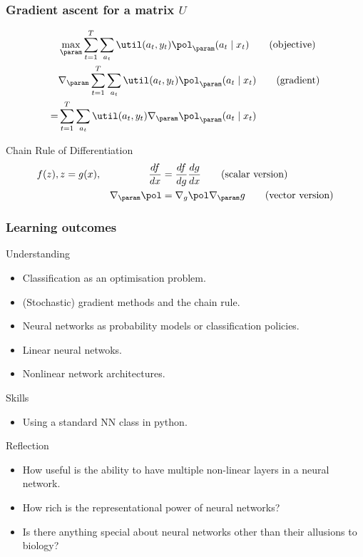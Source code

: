 \begin{frame}
\frametitle{Gradient ascent for a matrix $U$}
\begin{align}
  &\max_\param \sum_{t=1}^T \sum_{a_t} \util(a_t, y_t) \pol_\param(a_t \mid x_t ) \tag{objective}\\
  &\nabla_\param \sum_{t=1}^T \sum_{a_t} \util(a_t, y_t) \pol_\param(a_t \mid x_t ) \tag{gradient}\\
  =& \sum_{t=1}^T \sum_{a_t} \util(a_t, y_t) \nabla_\param \pol_\param(a_t \mid x_t )
\end{align}
\begin{block}{Chain Rule of Differentiation}
  \begin{align*}
    f(z), z = g(x), && \frac{df}{dx} &= \frac{df}{dg} \frac{dg}{dx} \tag{scalar version}\\
    && \nabla_\param \pol &= \nabla_g \pol \nabla_\param g \tag{vector version}
  \end{align*}
\end{block}
\end{frame}


\begin{frame}
  \frametitle{Learning outcomes}
  \begin{block}{Understanding}
    \begin{itemize}
    \item Classification as an optimisation problem.
    \item (Stochastic) gradient methods and the chain rule.
    \item Neural networks as probability models or classification policies.
    \item Linear neural netwoks.
    \item Nonlinear network architectures.
    \end{itemize}
  \end{block}
  
  \begin{block}{Skills}
    \begin{itemize}
    \item Using a standard NN class in python.
    \end{itemize}
  \end{block}

  \begin{block}{Reflection}
    \begin{itemize}
    \item How useful is the ability to have multiple non-linear layers in a neural network.
    \item How rich is the representational power of neural networks?
    \item Is there anything special about neural networks other than their allusions to biology?
    \end{itemize}
  \end{block}
  
\end{frame}



